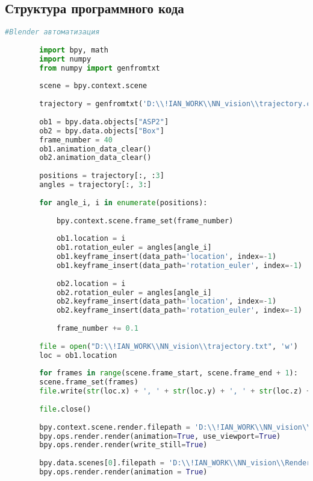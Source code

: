 \documentclass[12pt,a4paper]{article}
\newcommand{\названиеРаботы}
{Разработка модели сверточной нейронной сети, обученную на сгенерированных размеченных данных СКТ}
\newcommand{\идРаботы}
{8888.00.0019-0019/001}
\newcommand{\темаРаботы}
{СКТ}
\newcommand{\номерСлужебки}
{}
\newcommand{\ДолжностьАвтораОтчета}{Инженер}
\newcommand{\НашОтдел}{Научно-исследовательский центр суперкомпьютерных технологий}
\newcommand{\НазваниеДокумента}{Служебная записка}
\newcommand{\КомуСлужебкаДолжность}{Заместителю технического директора}
\newcommand{\КомуСлужебкаФИО}{Никитушкину М.В.}
\newcommand{\ОтКогоСлужебкаДолжность}{\ДолжностьАвтораОтчета}
\newcommand{\ОтКогоСлужебкаФИО}{Ниженко И.А.}
\newcommand{\ИсполнительФИО}{Ниженко И.А. \\тел.:    75-39}
\begin{document}
	\subsection{Структура программного кода}
	\begin{lstlisting}[language=Python]
	#Blender автоматизация
	
		import bpy, math
		import numpy
		from numpy import genfromtxt
		
		scene = bpy.context.scene
		
		trajectory = genfromtxt('D:\\!IAN_WORK\\NN_vision\\trajectory.csv', delimiter=',')
		
		ob1 = bpy.data.objects["ASP2"]
		ob2 = bpy.data.objects["Box"]
		frame_number = 40
		ob1.animation_data_clear()
		ob2.animation_data_clear()
		
		positions = trajectory[:, :3]
		angles = trajectory[:, 3:]
		
		for angle_i, i in enumerate(positions):
		
			bpy.context.scene.frame_set(frame_number)
		
			ob1.location = i
			ob1.rotation_euler = angles[angle_i]
			ob1.keyframe_insert(data_path='location', index=-1)
			ob1.keyframe_insert(data_path='rotation_euler', index=-1)
		
			ob2.location = i
			ob2.rotation_euler = angles[angle_i]
			ob2.keyframe_insert(data_path='location', index=-1)
			ob2.keyframe_insert(data_path='rotation_euler', index=-1)
		
			frame_number += 0.1
		
		file = open("D:\\!IAN_WORK\\NN_vision\\trajectory.txt", 'w')
		loc = ob1.location
		
		for frames in range(scene.frame_start, scene.frame_end + 1):
		scene.frame_set(frames)
		file.write(str(loc.x) + ', ' + str(loc.y) + ', ' + str(loc.z) + '\n')
		
		file.close()
		
		bpy.context.scene.render.filepath = 'D:\\!IAN_WORK\\NN_vision\\RenderAll\\video\\'
		bpy.ops.render.render(animation=True, use_viewport=True)
		bpy.ops.render.render(write_still=True)
		
		bpy.data.scenes[0].filepath = 'D:\\!IAN_WORK\\NN_vision\\RenderAll\\'
		bpy.ops.render.render(animation = True)
	\end{lstlisting}
\end{document}
